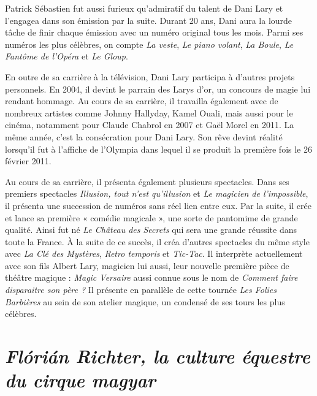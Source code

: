 Patrick Sébastien fut aussi furieux qu’admiratif du talent de Dani Lary et l’engagea dans son émission par la suite. Durant 20 ans, Dani aura la lourde tâche de finir chaque émission avec un numéro original tous les mois. Parmi ses numéros les plus célèbres, on compte \textit{La veste}, \textit{Le piano volant}, \textit{La Boule}, \textit{Le Fantôme de l’Opéra} et \textit{Le Gloup}.

En outre de sa carrière à la télévision, Dani Lary participa à d’autres projets personnels. En 2004, il devint le parrain des Larys d’or, un concours de magie lui rendant hommage. Au cours de sa carrière, il travailla également avec de nombreux artistes comme Johnny Hallyday, Kamel Ouali, mais aussi pour le cinéma, notamment pour Claude Chabrol en 2007 et Gaël Morel en 2011. La même année, c'est la consécration pour Dani Lary. Son rêve devint réalité lorsqu’il fut à l’affiche de l’Olympia dans lequel il se produit la première fois le 26 février 2011.

Au cours de sa carrière, il présenta également plusieurs spectacles. Dans ses premiers spectacles \textit{Illusion, tout n’est qu’illusion} et \textit{Le magicien de l’impossible}, il présenta une succession de numéros sans réel lien entre eux. Par la suite, il crée et lance sa première « comédie magicale », une sorte de pantomime de grande qualité. Ainsi fut né \textit{Le Château des Secrets} qui sera une grande réussite dans toute la France. À la suite de ce succès, il créa d’autres spectacles du même style avec \textit{La Clé des Mystères}, \textit{Retro temporis} et \textit{Tic-Tac}. Il interprète actuellement avec son fils Albert Lary, magicien lui aussi, leur nouvelle première pièce de théâtre magique : \textit{Magic Versaire} aussi connue sous le nom de \textit{Comment faire disparaitre son père ?} Il présente en parallèle de cette tournée \textit{Les Folies Barbières} au sein de son atelier magique, un condensé de ses tours les plus célèbres. 

\section*{\textit{Flórián Richter, la culture équestre du cirque magyar}}
{}

\thispagestyle{empty} %

